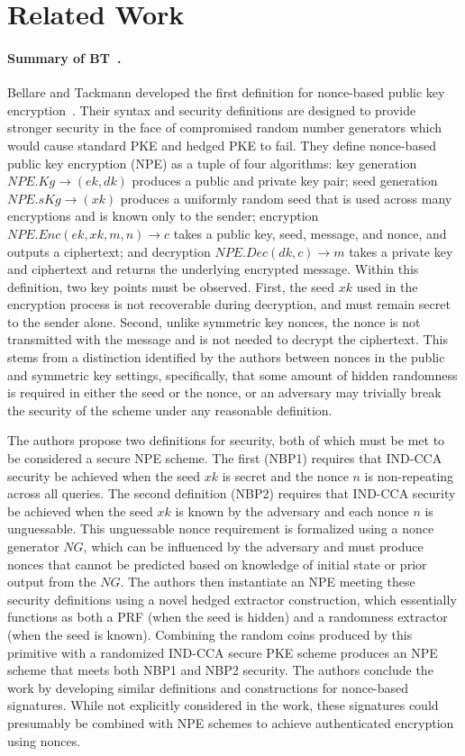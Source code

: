 \section{Related Work}
\label{rel_wk}
\paragraph{Summary of BT~\cite{BellareTackmann}. }

Bellare and Tackmann developed the first definition for nonce-based public key encryption~\cite{BellareTackmann}.
Their syntax and security definitions are designed to provide stronger security in the face of compromised random number generators
which would cause standard PKE and hedged PKE to fail.  They define nonce-based public key encryption (NPE) as a tuple
of four algorithms: key generation $NPE.Kg \rightarrow (ek,dk)$ produces a public and private key pair; seed generation
$NPE.sKg \rightarrow (xk)$ produces a uniformly random seed that is used across many encryptions and is known only to
the sender; encryption $NPE.Enc(ek, xk, m, n) \rightarrow c$ takes a public key, seed, message, and nonce, and outputs
a ciphertext; and decryption $NPE.Dec(dk, c) \rightarrow m$ takes a private key and ciphertext and returns the underlying
encrypted message.  Within this definition, two key points must be observed.  First, the seed $xk$ used in the encryption
process is not recoverable during decryption, and must remain secret to the sender alone.  Second, unlike symmetric key 
nonces, the nonce is not transmitted with the message and is not needed to decrypt the ciphertext.  This stems from a distinction
identified by the authors between nonces in the public and symmetric key settings, specifically, that some amount of hidden
randomness is required in either the seed or the nonce, or an adversary may trivially break the security of the scheme under 
any reasonable definition.

The authors propose two definitions for security, both of which must be met to be considered a secure NPE scheme.  The first
(NBP1) requires that IND-CCA security be achieved when the seed $xk$ is secret and the nonce $n$ is non-repeating across
all queries.  The second definition (NBP2) requires that IND-CCA security be achieved when the seed $xk$ is known by the
adversary and each nonce $n$ is unguessable.  This unguessable nonce requirement is formalized using a nonce generator
$NG$, which can be influenced by the adversary and must produce nonces that cannot be predicted based on knowledge of
initial state or prior output from the $NG$.  The authors then instantiate an NPE meeting these security definitions using a novel 
hedged extractor construction, which essentially functions as both a PRF (when the seed is hidden) and a randomness
extractor (when the seed is known).  Combining the random coins produced by this primitive with a randomized IND-CCA
secure PKE scheme produces an NPE scheme that meets both NBP1 and NBP2 security.  The authors conclude the work by
developing similar definitions and constructions for nonce-based signatures.  While not explicitly considered in the work,
these signatures could presumably be combined with NPE schemes to achieve authenticated encryption using nonces.

